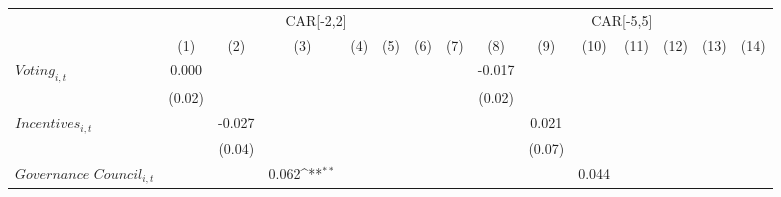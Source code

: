 {
\def\sym#1{\ifmmode^{#1}\else\(^{#1}\)\fi}
\begin{tabular}{l*{14}{c}}
\toprule
                    &\multicolumn{7}{c}{CAR[-2,2]}                                                                                                                            &\multicolumn{7}{c}{CAR[-5,5]}                                                                                                                            \\
                    &\multicolumn{1}{c}{(1)}         &\multicolumn{1}{c}{(2)}         &\multicolumn{1}{c}{(3)}         &\multicolumn{1}{c}{(4)}         &\multicolumn{1}{c}{(5)}         &\multicolumn{1}{c}{(6)}         &\multicolumn{1}{c}{(7)}         &\multicolumn{1}{c}{(8)}         &\multicolumn{1}{c}{(9)}         &\multicolumn{1}{c}{(10)}         &\multicolumn{1}{c}{(11)}         &\multicolumn{1}{c}{(12)}         &\multicolumn{1}{c}{(13)}         &\multicolumn{1}{c}{(14)}         \\
\midrule
$\textit{Voting}_{i,t}$&       0.000         &                     &                     &                     &                     &                     &                     &      -0.017         &                     &                     &                     &                     &                     &                     \\
                    &      (0.02)         &                     &                     &                     &                     &                     &                     &      (0.02)         &                     &                     &                     &                     &                     &                     \\
$\textit{Incentives}_{i,t}$&                     &      -0.027         &                     &                     &                     &                     &                     &                     &       0.021         &                     &                     &                     &                     &                     \\
                    &                     &      (0.04)         &                     &                     &                     &                     &                     &                     &      (0.07)         &                     &                     &                     &                     &                     \\
$\textit{Governance Council}_{i,t}$&                     &                     &       0.062\sym{**} &                     &                     &                     &                     &                     &                     &       0.044         &                     &                     &                     &                     \\

\end{tabular}}
